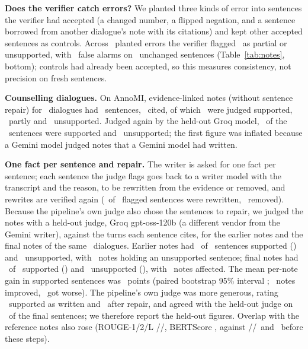 \textbf{Does the verifier catch errors?} We planted three kinds of error into sentences the verifier had accepted (a changed number, a flipped negation, and a sentence borrowed from another dialogue's note with its citations) and kept other accepted sentences as controls. Across \ResInjPlantedN\ planted errors the verifier flagged \ResInjRecallPct\ as partial or unsupported, with \ResInjFaPct\ false alarms on \ResInjControlN\ unchanged sentences (Table~\ref{tab:notes}, bottom); controls had already been accepted, so this measures consistency, not precision on fresh sentences.

\textbf{Counselling dialogues.} On AnnoMI, evidence-linked notes (without sentence repair) for \ResAnnoNotesN\ dialogues had \ResAnnoSentences\ sentences, \ResAnnoCited\ cited, of which \ResAnnoSupported\ were judged supported, \ResAnnoPartial\ partly and \ResAnnoUnsupported\ unsupported. Judged again by the held-out Groq model, \ResAnnoHeldSupported\ of the \ResAnnoSentences\ sentences were supported and \ResAnnoHeldUnsupported\ unsupported; the first figure was inflated because a Gemini model judged notes that a Gemini model had written.

\ifrecheck
\textbf{One fact per sentence and repair.} The writer is asked for one fact per sentence; each sentence the judge flags goes back to a writer model with the transcript and the reason, to be rewritten from the evidence or removed, and rewrites are verified again (\ResAblRepairRewritten\ of \ResAblRepairFlagged\ flagged sentences were rewritten, \ResAblRepairRemoved\ removed). Because the pipeline's own judge also chose the sentences to repair, we judged the notes with a held-out judge, Groq gpt-oss-120b (a different vendor from the Gemini writer), against the turns each sentence cites, for the earlier notes and the final notes of the same \ResAblNotes\ dialogues. Earlier notes had \ResAblEarlierSupported\ of \ResAblEarlierSentences\ sentences supported (\ResAblEarlierSupportedCi) and \ResAblEarlierUnsupported\ unsupported, with \ResAblEarlierNotesUnsupported\ notes holding an unsupported sentence; final notes had \ResAblHeldSupported\ of \ResAblHeldSentences\ supported (\ResAblHeldSupportedCi) and \ResAblHeldUnsupported\ unsupported (\ResAblHeldUnsupportedCi), with \ResAblHeldNotesUnsupported\ notes affected. The mean per-note gain in supported sentences was \ResAblGain\ points (paired bootstrap 95\% interval \ResAblGainCi; \ResAblImproved\ notes improved, \ResAblWorse\ got worse). The pipeline's own judge was more generous, rating \ResAblVerSupported\ supported as written and \ResAblRepSupported\ after repair, and agreed with the held-out judge on \ResAblHeldAgree\ of the final sentences; we therefore report the held-out figures. Overlap with the reference notes also rose (ROUGE-1/2/L \ResAblRougeOne/\ResAblRougeTwo/\ResAblRougeL, BERTScore \ResAblBert, against \ResBaseLinkedRougeOne/\ResBaseLinkedRougeTwo/\ResBaseLinkedRougeL\ and \ResBaseLinkedBert\ before these steps).
\fi

